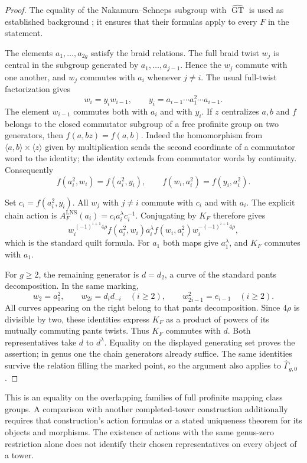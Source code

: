 \begin{proof}
The equality of the Nakamura--Schneps subgroup with
$\widehat{\operatorname{GT}}$ is used as established background
\cite[Corollary 21]{H17}; it ensures that their formulas apply to every
$F$ in the statement.

The elements $a_1,\ldots,a_{2g}$ satisfy the braid relations. The full
braid twist $w_j$ is central in the subgroup generated by
$a_1,\ldots,a_{j-1}$. Hence the $w_j$ commute with one another, and
$w_j$ commutes with $a_i$ whenever $j\ne i$. The usual full-twist
factorization gives
\[
 w_i=y_iw_{i-1},\qquad
 y_i=a_{i-1}\cdots a_1^2\cdots a_{i-1}.
\]
The element $w_{i-1}$ commutes both with $a_i$ and with $y_i$.
If $z$ centralizes $a,b$ and $f$ belongs to the closed commutator
subgroup of a free profinite group on two generators, then
$f(a,bz)=f(a,b)$. Indeed the homomorphism from
$\langle a,b\rangle\times\langle z\rangle$ given by multiplication
sends the second coordinate of a commutator word to the identity;
the identity extends from commutator words by continuity.
Consequently
\[
 f(a_i^2,w_i)=f(a_i^2,y_i),\qquad
 f(w_i,a_i^2)=f(y_i,a_i^2).
\]

Set $c_i=f(a_i^2,y_i)$. All $w_j$ with $j\ne i$ commute with
$c_i$ and with $a_i$. The explicit chain action is
$A_F^{\mathrm{LNS}}(a_i)=c_i a_i^\lambda c_i^{-1}$.
Conjugating by $K_F$ therefore gives
\[
 w_i^{\,(-1)^{i+1}4\rho}
 f(a_i^2,w_i)a_i^\lambda f(w_i,a_i^2)
 w_i^{-(-1)^{i+1}4\rho},
\]
which is the standard quilt formula. For $a_1$ both maps give
$a_1^\lambda$, and $K_F$ commutes with $a_1$.

For $g\geq2$, the remaining generator is $d=d_2$, a curve of the
standard pants decomposition. In the same marking,
\[
 w_2=a_1^2,\qquad
 w_{2i}=d_i d_{-i}\quad(i\geq2),\qquad
 w_{2i-1}^{2}=e_{i-1}\quad(i\geq2).
\]
All curves appearing on the right belong to that pants decomposition.
Since $4\rho$ is divisible by two, these identities express $K_F$ as
a product of powers of its mutually commuting pants twists. Thus
$K_F$ commutes with $d$. Both representatives take $d$ to $d^\lambda$.
Equality on the displayed generating set proves the assertion; in
genus one the chain generators already suffice. The same identities
survive the relation filling the marked point, so the argument also
applies to $\widehat\Gamma_{g,0}$.
\end{proof}

This is an equality on the overlapping families of full profinite
mapping class groups. A comparison with another completed-tower
construction additionally requires that construction's action formulas
or a stated uniqueness theorem for its objects and morphisms. The
existence of actions with the same genus-zero restriction alone does
not identify their chosen representatives on every object of a tower.

